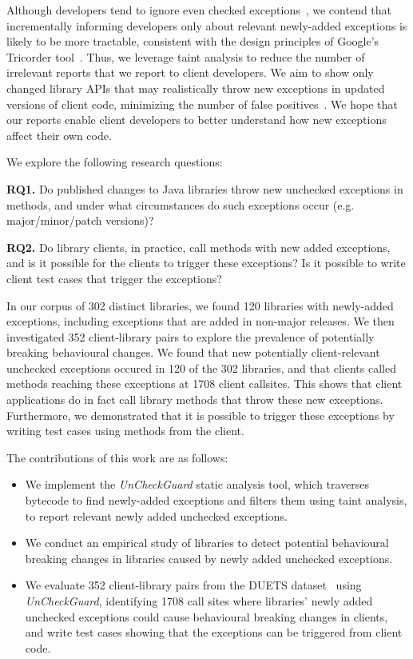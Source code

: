 Although developers tend to ignore even checked
exceptions~\cite{nakshatri16:_analy_java}, we contend that incrementally informing
developers only about relevant newly-added exceptions is likely to be more tractable, consistent with the
design principles of Google's Tricorder tool~\cite{sadowski15:_tricor}.
Thus, we leverage taint analysis
to reduce the number of irrelevant reports that we report to client developers.
We aim to show only changed library APIs that may realistically throw new exceptions
in updated versions of client code, minimizing the number of false positives~\cite{pashchenko20:_vuln4,pashchenko18:_vulner}.
We hope that our reports enable client developers to better understand how new exceptions affect their own code.

We explore the following research questions:

\noindent
{\bf RQ1.} Do published changes to Java libraries throw new unchecked exceptions in methods,
and under what circumstances do such exceptions occur (e.g. major/minor/patch versions)?

\noindent
{\bf RQ2.} Do library clients, in practice, call methods with new added exceptions, and is it possible for the clients to trigger these exceptions? Is it possible to write client test cases that trigger the exceptions?

In our corpus of 302 distinct libraries, we found 120 libraries with newly-added exceptions, including exceptions that are added in non-major releases.
We then investigated 352 client-library pairs to explore the prevalence of potentially breaking behavioural changes.
We found that new potentially client-relevant unchecked exceptions occured in 120 of the 302 libraries, and that clients called methods reaching these exceptions at 1708 client callsites.
This shows that client applications do in fact call library methods that throw these new exceptions.
Furthermore, we demonstrated that it is possible to trigger these exceptions by writing test cases using methods from the client.

The contributions of this work are as follows:

\begin{itemize}[noitemsep]
\item We implement the \textit{UnCheckGuard} static analysis tool, which traverses bytecode to find newly-added exceptions and filters them using taint analysis, to report relevant newly added unchecked exceptions.
\item We conduct an empirical study of libraries to detect potential behavioural breaking changes in libraries caused by newly added unchecked exceptions.
\item We evaluate 352 client-library pairs from the DUETS dataset~\cite{durieux21:_duets} using \textit{UnCheckGuard}, identifying 1708 call sites where libraries' newly added unchecked exceptions could cause behavioural breaking changes in clients, and write test cases showing that the exceptions can be triggered from client code.
\end{itemize}

